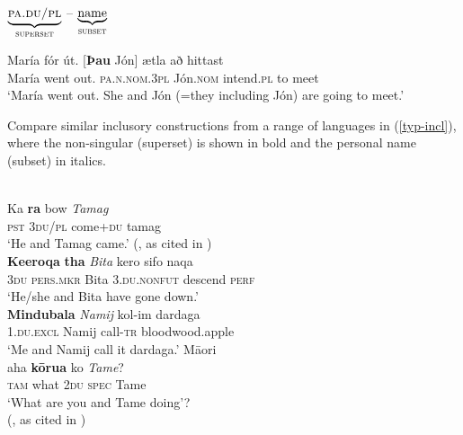 \documentclass[output=paper,colorlinks,citecolor=brown]{langscibook}
\begin{document}
\ea \label{super-sub}
 $\underbrace{\textsc{pa.du/pl}}_{\textsc{superset}}$ --  $\underbrace{\textrm{name}}_{\textsc{subset}}$
 \z 

\ea  \label{gap-sig-rep}
\gll María fór út. [\textbf{Þau} Jón] ætla að hittast \\
María went out. \textsc{pa.n.nom.3pl} Jón.\textsc{nom} intend.\textsc{pl} to meet\\
\glt `María went out. She and Jón (=they including Jón) are going to meet.'
\z 

Compare similar inclusory constructions from a range of languages in (\ref{typ-incl}), where the non-singular  (superset) is shown in bold and the personal name (subset) in italics.

\ea \label{typ-incl}
\ea {}\\
\gll Ka \textbf{ra} bow \textit{Tamag}\\
\textsc{pst} 3\textsc{du/pl} come+\textsc{du} tamag\\
\glt `He and Tamag came.' (\citealp[270]{jensen1977yapese}, as cited in \citealp[519]{aissen1989agreement})
\ex {} \\
\gll \textbf{Keeroqa} \textbf{tha} \textit{Bita} kero sifo naqa\\
3\textsc{du} \textsc{pers.mkr} Bita 3.\textsc{du.nonfut} descend \textsc{perf}\\
\glt `He/she and Bita have gone down.' \citep[10]{lichtenberk2000inclusory}
\ex {} \\
\gll \textbf{Mindubala} \textit{Namij} kol-im dardaga\\
1.\textsc{du.excl} Namij call-\textsc{tr} bloodwood.apple\\
\glt `Me and Namij call it dardaga.' \citep[243]{schultze2013kriol}
\ex M{\=a}ori \\
 aha \textbf{k{\=o}rua} ko \textit{Tame}?\\
\textsc{tam} what 2\textsc{du} \textsc{spec} Tame\\
\glt `What are you and Tame doing'? \\ 
(\citealp[548]{bauer1997reed}, as cited in \citealp[246]{bril2011noun})
\z 
\z 
\end{document}
